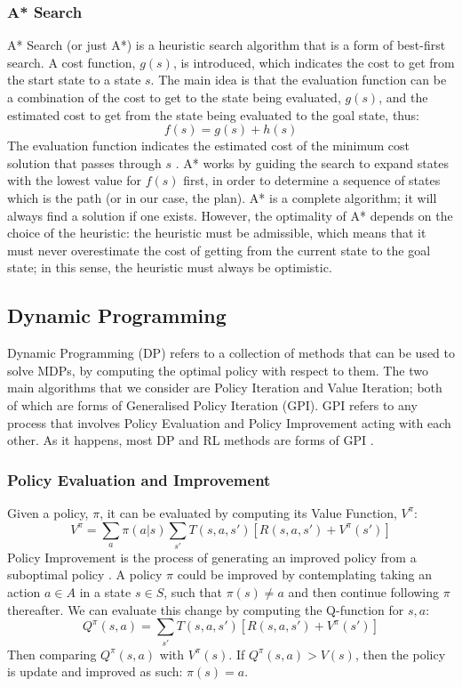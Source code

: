 \subsubsection{A* Search}
\label{sec:astar}
A* Search (or just A*) \cite{4082128} is a heuristic search algorithm that is a form of best-first search. A cost function, $g(s)$, is introduced, which indicates the cost to get from the start state to a state $s$. The main idea is that the evaluation function can be a combination of the cost to get to the state being evaluated, $g(s)$, and the estimated cost to get from the state being evaluated to the goal state, thus:
\begin{equation}
\label{eqn:astarr}
f(s) = g(s) + h(s)
\end{equation}
The evaluation function indicates the estimated cost of the minimum cost solution that passes through $s$ \cite{DBLP:books/aw/RN2020}. A* works by guiding the search to expand states with the lowest value for $f(s)$ first, in order to determine a sequence of states which is the path (or in our case, the plan). A* is a complete algorithm; it will always find a solution if one exists. However, the optimality of A* depends on the choice of the heuristic: the heuristic must be admissible, which means that it must never overestimate the cost of getting from the current state to the goal state; in this sense, the heuristic must always be optimistic.

\subsection{Dynamic Programming}
Dynamic Programming (DP) \cite{Bellman:1957, DBLP:books/lib/Bertsekas05} refers to a collection of methods that can be used to solve MDPs, by computing the optimal policy with respect to them. The two main algorithms that we consider are Policy Iteration and Value Iteration; both of which are forms of Generalised Policy Iteration (GPI). GPI refers to any process that involves Policy Evaluation and Policy Improvement acting with each other. As it happens, most DP and RL methods are forms of GPI \cite{Sutton1998}.

\subsubsection{Policy Evaluation and Improvement}
Given a policy, $\pi$, it can be evaluated by computing its Value Function, $V^\pi$:
\begin{equation}
\label{eqn:policyeval}
V^\pi = \sum_a \pi(a|s)\sum_{s'}T(s,a,s')[R(s,a,s') + V^\pi(s')]
\end{equation}
Policy Improvement is the process of generating an improved policy from a suboptimal policy \cite{DBLP:books/lib/Bertsekas05}. A policy $\pi$ could be improved by contemplating taking an action $a \in A$ in a state $s \in S$, such that $\pi(s) \neq a$ and then continue following $\pi$ thereafter. We can evaluate this change by computing the Q-function for $s,a$:
\begin{equation}
\label{eqn:qval}
Q^\pi(s,a) = \sum_{s'}T(s,a,s')[R(s,a,s') + V^\pi(s')]
\end{equation}
Then comparing $Q^\pi(s,a)$ with $V^\pi(s)$. If $Q^\pi(s,a) > V(s)$, then the policy is update and improved as such: $\pi(s) = a$.
